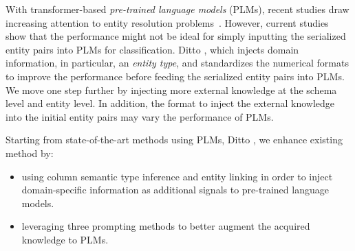 With transformer-based \emph{pre-trained language models} (PLMs), recent studies draw increasing attention to entity resolution problems~\cite{li_deep_2020, trabelsi_dame_2022}. However, current studies show that the performance might not be ideal for simply inputting the serialized entity pairs into PLMs for classification. Ditto \cite{li_deep_2020}, which injects domain information, in particular, an \emph{entity type}, and standardizes the numerical formats to improve the performance before feeding the serialized entity pairs into PLMs.
We move one step further by injecting more external knowledge at the schema level and entity level. In addition, the format to inject the external knowledge into the initial entity pairs may vary the performance of PLMs. %


Starting from state-of-the-art methods using PLMs, Ditto \cite{li_deep_2020}, we enhance existing method by:
\begin{itemize}
    \item using column semantic type inference and entity linking in order to inject domain-specific information as additional signals to pre-trained language models.
    \item leveraging three prompting methods to better augment the acquired knowledge to PLMs.
\end{itemize}
 


    
